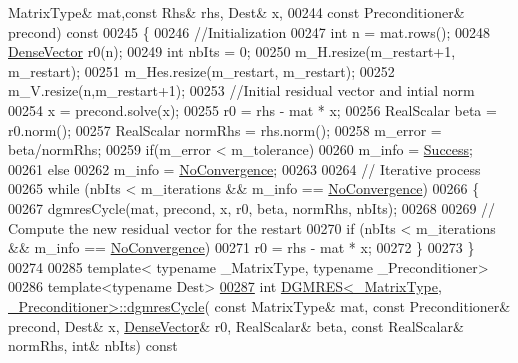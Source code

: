 \begin{DoxyCode}
      MatrixType& mat,\textcolor{keyword}{const} Rhs& rhs, Dest& x,
00244               \textcolor{keyword}{const} Preconditioner& precond)\textcolor{keyword}{ const}
00245 \textcolor{keyword}{}\{
00246   \textcolor{comment}{//Initialization}
00247   \textcolor{keywordtype}{int} n = mat.rows(); 
00248   \hyperlink{group___core___module}{DenseVector} r0(n); 
00249   \textcolor{keywordtype}{int} nbIts = 0; 
00250   m\_H.resize(m\_restart+1, m\_restart);
00251   m\_Hes.resize(m\_restart, m\_restart);
00252   m\_V.resize(n,m\_restart+1);
00253   \textcolor{comment}{//Initial residual vector and intial norm}
00254   x = precond.solve(x);
00255   r0 = rhs - mat * x; 
00256   RealScalar beta = r0.norm(); 
00257   RealScalar normRhs = rhs.norm();
00258   m\_error = beta/normRhs; 
00259   \textcolor{keywordflow}{if}(m\_error < m\_tolerance)
00260     m\_info = \hyperlink{group__enums_gga85fad7b87587764e5cf6b513a9e0ee5ea52581b035f4b59c203b8ff999ef5fcea}{Success}; 
00261   \textcolor{keywordflow}{else}
00262     m\_info = \hyperlink{group__enums_gga85fad7b87587764e5cf6b513a9e0ee5eaba1c8763d1179778070f365ecc4157a8}{NoConvergence};
00263   
00264   \textcolor{comment}{// Iterative process}
00265   \textcolor{keywordflow}{while} (nbIts < m\_iterations && m\_info == \hyperlink{group__enums_gga85fad7b87587764e5cf6b513a9e0ee5eaba1c8763d1179778070f365ecc4157a8}{NoConvergence})
00266   \{
00267     dgmresCycle(mat, precond, x, r0, beta, normRhs, nbIts); 
00268     
00269     \textcolor{comment}{// Compute the new residual vector for the restart }
00270     \textcolor{keywordflow}{if} (nbIts < m\_iterations && m\_info == \hyperlink{group__enums_gga85fad7b87587764e5cf6b513a9e0ee5eaba1c8763d1179778070f365ecc4157a8}{NoConvergence})
00271       r0 = rhs - mat * x; 
00272   \}
00273 \} 
00274 
00285 \textcolor{keyword}{template}< \textcolor{keyword}{typename} \_MatrixType, \textcolor{keyword}{typename} \_Preconditioner>
00286 \textcolor{keyword}{template}<\textcolor{keyword}{typename} Dest>
\hyperlink{class_eigen_1_1_d_g_m_r_e_s_a151b188720b20e13e8e6b112a8bcc167}{00287} \textcolor{keywordtype}{int} \hyperlink{class_eigen_1_1_d_g_m_r_e_s_a151b188720b20e13e8e6b112a8bcc167}{DGMRES<\_MatrixType, \_Preconditioner>::dgmresCycle}(\textcolor{keyword}{
      const} MatrixType& mat, \textcolor{keyword}{const} Preconditioner& precond, Dest& x, \hyperlink{group___core___module}{DenseVector}& r0, RealScalar& beta, \textcolor{keyword}{
      const} RealScalar& normRhs, \textcolor{keywordtype}{int}& nbIts)\textcolor{keyword}{ const}

\end{DoxyCode}
